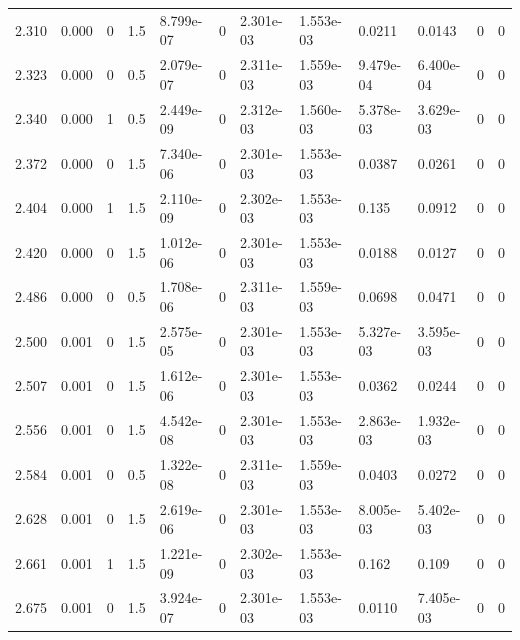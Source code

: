 \documentclass[preview]{standalone}
\begin{document}
{{{\begin{tabular}{L{1.2cm}C{1.2cm} C{0.3cm}C{0.5cm} C{1.4cm}C{1.4cm} C{1.4cm}C{1.4cm} C{1.6cm}C{1.6cm} C{1.6cm}C{1.6cm}}
  2.310  &  0.000  & 0     & 1.5 &  8.799e-07  & 0  &  2.301e-03&   1.553e-03& 0.0211 & 0.0143   &  0 & 0  \\ 
  2.323  &  0.000  & 0     & 0.5 &  2.079e-07  & 0  &  2.311e-03&   1.559e-03& 9.479e-04 & 6.400e-04   &  0 & 0  \\ 
  2.340  &  0.000  & 1     & 0.5 &  2.449e-09  & 0  &  2.312e-03&   1.560e-03& 5.378e-03 & 3.629e-03   &  0 & 0  \\ 
  2.372  &  0.000  & 0     & 1.5 &  7.340e-06  & 0  &  2.301e-03&   1.553e-03& 0.0387 & 0.0261   &  0 & 0  \\ 
  2.404  &  0.000  & 1     & 1.5 &  2.110e-09  & 0  &  2.302e-03&   1.553e-03& 0.135 & 0.0912   &  0 & 0  \\ 
  2.420  &  0.000  & 0     & 1.5 &  1.012e-06  & 0  &  2.301e-03&   1.553e-03& 0.0188 & 0.0127   &  0 & 0  \\ 
  2.486  &  0.000  & 0     & 0.5 &  1.708e-06  & 0  &  2.311e-03&   1.559e-03& 0.0698 & 0.0471   &  0 & 0  \\ 
  2.500  &  0.001  & 0     & 1.5 &  2.575e-05  & 0  &  2.301e-03&   1.553e-03& 5.327e-03 & 3.595e-03   &  0 & 0  \\ 
  2.507  &  0.001  & 0     & 1.5 &  1.612e-06  & 0  &  2.301e-03&   1.553e-03& 0.0362 & 0.0244   &  0 & 0  \\ 
  2.556  &  0.001  & 0     & 1.5 &  4.542e-08  & 0  &  2.301e-03&   1.553e-03& 2.863e-03 & 1.932e-03   &  0 & 0  \\ 
  2.584  &  0.001  & 0     & 0.5 &  1.322e-08  & 0  &  2.311e-03&   1.559e-03& 0.0403 & 0.0272   &  0 & 0  \\ 
  2.628  &  0.001  & 0     & 1.5 &  2.619e-06  & 0  &  2.301e-03&   1.553e-03& 8.005e-03 & 5.402e-03   &  0 & 0  \\ 
  2.661  &  0.001  & 1     & 1.5 &  1.221e-09  & 0  &  2.302e-03&   1.553e-03& 0.162 & 0.109   &  0 & 0  \\ 
  2.675  &  0.001  & 0     & 1.5 &  3.924e-07  & 0  &  2.301e-03&   1.553e-03& 0.0110 & 7.405e-03   &  0 & 0  \\ 
\hline 
\end{tabular} 

}}}
\end{document}
